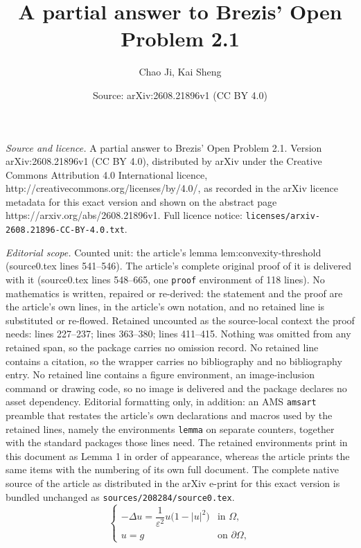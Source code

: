 \documentclass[10pt,a4paper]{amsart}
\title{A partial answer to Brezis' Open Problem 2.1}
\author{Chao Ji, Kai Sheng}
\date{Source: arXiv:2608.21896v1 (CC BY 4.0)}
\newcommand{\abs}[1]{\lvert#1\rvert}
\begin{document}
\maketitle

\noindent\emph{Source and licence.} A partial answer to Brezis' Open Problem 2.1. Version arXiv:2608.21896v1 (CC BY 4.0), distributed by arXiv under the Creative Commons Attribution 4.0 International licence, http://creativecommons.org/licenses/by/4.0/, as recorded in the arXiv licence metadata for this exact version and shown on the abstract page https://arxiv.org/abs/2608.21896v1. Full licence notice: \texttt{licenses/arxiv-2608.21896-CC-BY-4.0.txt}.\par\smallskip

\noindent\textit{Editorial scope.} Counted unit: the article's lemma lem:convexity-threshold (source0.tex lines 541--546). The article's complete original proof of it is delivered with it (source0.tex lines 548--665, one \texttt{proof} environment of 118 lines). No mathematics is written, repaired or re-derived: the statement and the proof are the article's own lines, in the article's own notation, and no retained line is substituted or re-flowed.  Retained uncounted as the source-local context the proof needs: lines 227--237; lines 363--380; lines 411--415.  Nothing was omitted from any retained span, so the package carries no omission record.  No retained line contains a citation, so the wrapper carries no bibliography and no bibliography entry.  No retained line contains a figure environment, an image-inclusion command or drawing code, so no image is delivered and the package declares no asset dependency.  Editorial formatting only, in addition: an AMS \texttt{amsart} preamble that restates the article's own declarations and macros used by the retained lines, namely the environments \texttt{lemma} on separate counters, together with the standard packages those lines need.  The retained environments print in this document as Lemma 1 in order of appearance, whereas the article prints the same items with the numbering of its own full document.  The complete native source of the article as distributed in the arXiv e-print for this exact version is bundled unchanged as \texttt{sources/208284/source0.tex}.
\begin{equation}\label{eq:general-GL-system}
	\begin{cases}
		-\Delta u
		=
		\dfrac{1}{\varepsilon^2}
		u\bigl(1-\abs{u}^2\bigr)
		& \text{in } \Omega,\\[2mm]
		u=g
		& \text{on } \partial\Omega,
	\end{cases}
\end{equation}
\end{document}

